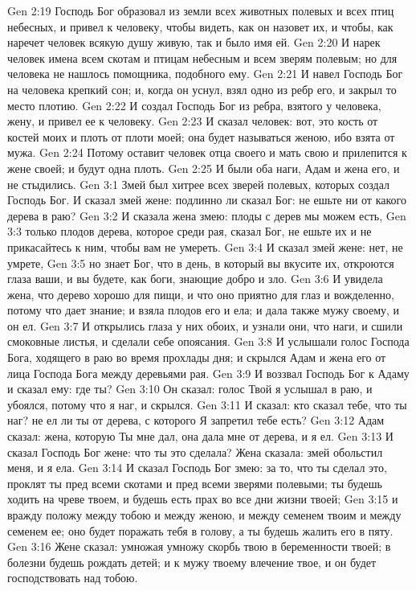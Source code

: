 Gen 2:19  Господь Бог образовал из земли всех животных полевых и всех птиц небесных, и привел к человеку, чтобы видеть, как он назовет их, и чтобы, как наречет человек всякую душу живую, так и было имя ей.
Gen 2:20  И нарек человек имена всем скотам и птицам небесным и всем зверям полевым; но для человека не нашлось помощника, подобного ему.
Gen 2:21  И навел Господь Бог на человека крепкий сон; и, когда он уснул, взял одно из ребр его, и закрыл то место плотию.
Gen 2:22  И создал Господь Бог из ребра, взятого у человека, жену, и привел ее к человеку.
Gen 2:23  И сказал человек: вот, это кость от костей моих и плоть от плоти моей; она будет называться женою, ибо взята от мужа.
Gen 2:24  Потому оставит человек отца своего и мать свою и прилепится к жене своей; и будут одна плоть.
Gen 2:25  И были оба наги, Адам и жена его, и не стыдились.
Gen 3:1  Змей был хитрее всех зверей полевых, которых создал Господь Бог. И сказал змей жене: подлинно ли сказал Бог: не ешьте ни от какого дерева в раю?
Gen 3:2  И сказала жена змею: плоды с дерев мы можем есть,
Gen 3:3  только плодов дерева, которое среди рая, сказал Бог, не ешьте их и не прикасайтесь к ним, чтобы вам не умереть.
Gen 3:4  И сказал змей жене: нет, не умрете,
Gen 3:5  но знает Бог, что в день, в который вы вкусите их, откроются глаза ваши, и вы будете, как боги, знающие добро и зло.
Gen 3:6  И увидела жена, что дерево хорошо для пищи, и что оно приятно для глаз и вожделенно, потому что дает знание; и взяла плодов его и ела; и дала также мужу своему, и он ел.
Gen 3:7  И открылись глаза у них обоих, и узнали они, что наги, и сшили смоковные листья, и сделали себе опоясания.
Gen 3:8  И услышали голос Господа Бога, ходящего в раю во время прохлады дня; и скрылся Адам и жена его от лица Господа Бога между деревьями рая.
Gen 3:9  И воззвал Господь Бог к Адаму и сказал ему: где ты?
Gen 3:10  Он сказал: голос Твой я услышал в раю, и убоялся, потому что я наг, и скрылся.
Gen 3:11  И сказал: кто сказал тебе, что ты наг? не ел ли ты от дерева, с которого Я запретил тебе есть?
Gen 3:12  Адам сказал: жена, которую Ты мне дал, она дала мне от дерева, и я ел.
Gen 3:13  И сказал Господь Бог жене: что ты это сделала? Жена сказала: змей обольстил меня, и я ела.
Gen 3:14  И сказал Господь Бог змею: за то, что ты сделал это, проклят ты пред всеми скотами и пред всеми зверями полевыми; ты будешь ходить на чреве твоем, и будешь есть прах во все дни жизни твоей;
Gen 3:15  и вражду положу между тобою и между женою, и между семенем твоим и между семенем ее; оно будет поражать тебя в голову, а ты будешь жалить его в пяту.
Gen 3:16  Жене сказал: умножая умножу скорбь твою в беременности твоей; в болезни будешь рождать детей; и к мужу твоему влечение твое, и он будет господствовать над тобою.
